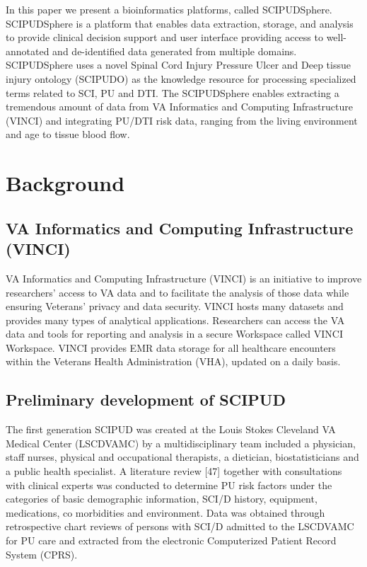 \documentclass{amia}
\begin{document}
In this paper we present a bioinformatics platforms, called SCIPUDSphere. SCIPUDSphere is a platform that enables data extraction, storage, and analysis to provide clinical decision support and user interface providing access to well-annotated and de-identified data generated from multiple domains. SCIPUDSphere uses a novel Spinal Cord Injury Pressure Ulcer and Deep tissue injury ontology (SCIPUDO) as the knowledge resource for processing specialized terms related to SCI, PU and DTI. The SCIPUDSphere enables extracting a tremendous amount of data from VA Informatics and Computing Infrastructure (VINCI) \cite{VINCI} and integrating PU/DTI risk data, ranging from the living environment and age to tissue blood flow. 

\section{Background}

\subsection{VA Informatics and Computing Infrastructure (VINCI)}
VA Informatics and Computing Infrastructure (VINCI) is an initiative to improve researchers' access to VA data and to facilitate the analysis of those data while ensuring Veterans' privacy and data security. VINCI hosts many datasets and provides many types of analytical applications. Researchers can access the VA data and tools for reporting and analysis in a secure Workspace called VINCI Workspace. VINCI provides EMR data storage for all healthcare encounters within the Veterans Health Administration (VHA), updated on a daily basis. 

\subsection{Preliminary development of SCIPUD}
The first generation SCIPUD was created at the Louis Stokes Cleveland VA Medical Center (LSCDVAMC) by a multidisciplinary team included a physician, staff nurses, physical and occupational therapists, a dietician, biostatisticians and a public health specialist. A literature review [47] together with consultations with clinical experts was conducted to determine PU risk factors under the categories of basic demographic information, SCI/D history, equipment, medications, co morbidities and environment. Data was obtained through retrospective chart reviews of persons with SCI/D admitted to the LSCDVAMC for PU care and extracted from the electronic Computerized Patient Record System (CPRS).
\end{document}
